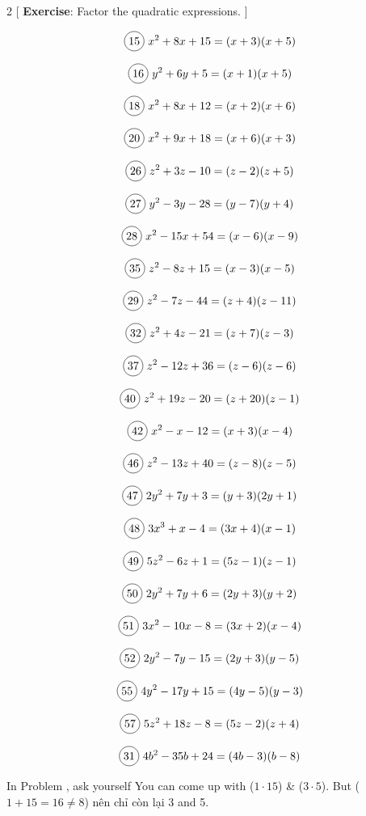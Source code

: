 \vspace{.6cm}

\begin{multicols}{2}
[
  \textbf{Exercise}: Factor the quadratic expressions.
]

\begin{align*}
  \circled{15}\ &x^{2}+8x+15=(x+3)(x+5)\\
\end{align*}

  \[\circled{16}\ y^{2}+6y+5=(x+1)(x+5)\]

  \[\circled{18}\ x^{2}+8x+12=(x+2)(x+6)\]

  \[\circled{20}\ x^{2}+9x+18=(x+6)(x+3)\]

  \[\circled{26}\ z^{2}+3z-10=(z-2)(z+5)\]

  \[\circled{27}\ y^{2}-3y-28=(y-7)(y+4)\]

  \[\circled{28}\ x^{2}-15x+54=(x-6)(x-9)\]

  \[\circled{35}\ z^{2}-8z+15=(x-3)(x-5)\]

  \[\circled{29}\ z^{2}-7z-44=(z+4)(z-11)\]

  \[\circled{32}\ z^{2}+4z-21=(z+7)(z-3)\]

  \[\circled{37}\ z^{2}-12z+36=(z-6)(z-6)\]

  \[\circled{40}\ z^{2}+19z-20=(z+20)(z-1)\]

  \[\circled{42}\ x^{2}-x-12=(x+3)(x-4)\]

  \[\circled{46}\ z^{2}-13z+40=(z-8)(z-5)\]

  \[\circled{47}\ 2y^{2}+7y+3=(y+3)(2y+1)\]

  \[\circled{48}\ 3x^{3}+x-4=(3x+4)(x-1)\]

  \[\circled{49}\ 5z^{2}-6z+1=(5z-1)(z-1)\]

  \[\circled{50}\ 2y^{2}+7y+6=(2y+3)(y+2)\]

  \[\circled{51}\ 3x^{2}-10x-8=(3x+2)(x-4)\]

  \[\circled{52}\ 2y^{2}-7y-15=(2y+3)(y-5)\]

  \[\circled{55}\ 4y^{2}-17y+15=(4y-5)(y-3)\]

  \[\circled{57}\ 5z^{2}+18z-8=(5z-2)(z+4)\]

  \[\circled{31}\ 4b^{2}-35b+24=(4b-3)(b-8)\]
\end{multicols}

In Problem , ask yourself  You can come up with ($1\cdot 15$) \& ($3\cdot 5$). But ($1+15=16 \neq 8$) nên chỉ còn lại 3 and 5.

